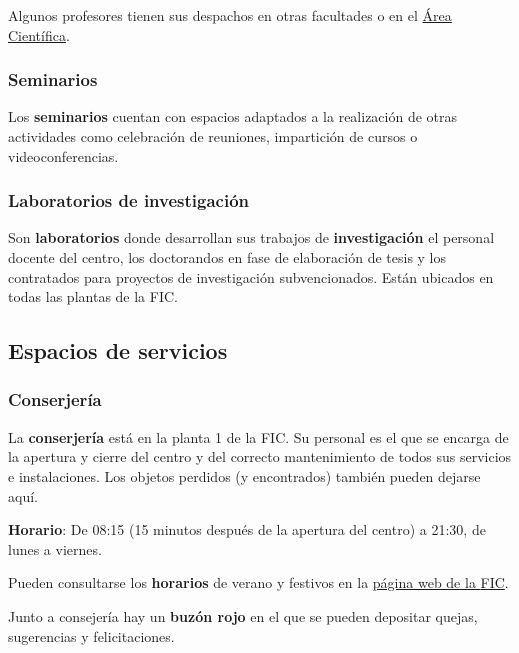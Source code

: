 \begin{infoBox}
    Algunos profesores tienen sus despachos en otras facultades o en el \href{https://www.udc.es/es/sobreUDC/localizacion/corunha/elvinha/area_cientifica/}{Área Científica}.
\end{infoBox}

\subsubsection{Seminarios}

Los \textbf{seminarios} cuentan con espacios adaptados a la realización de otras actividades como celebración de reuniones, impartición de cursos o videoconferencias.

\subsubsection{Laboratorios de investigación}

Son \textbf{laboratorios} donde desarrollan sus trabajos de \textbf{investigación} el personal docente del centro, los doctorandos en fase de elaboración de tesis y los contratados para proyectos de investigación subvencionados. Están ubicados en todas las plantas de la \acrshort{FIC}.

\subsection{Espacios de servicios}

\subsubsection{Conserjería}

La \textbf{conserjería} está en la planta 1 de la \acrshort{FIC}. Su personal es el que se encarga de la apertura y cierre del centro y del correcto mantenimiento de todos sus servicios e instalaciones. Los objetos perdidos (y encontrados) también pueden dejarse aquí.

\textbf{Horario}: De 08:15 (15 minutos después de la apertura del centro) a 21:30, de lunes a viernes.

\begin{infoBox}
    Pueden consultarse los \textbf{horarios} de verano y festivos en la \href{https://www.fic.udc.es/gl/conserxeria}{página web de la \acrshort{FIC}}.
\end{infoBox}

\begin{curiosityBox}
    Junto a consejería hay un \textbf{buzón rojo} en el que se pueden depositar quejas, sugerencias y felicitaciones.
\end{curiosityBox}

